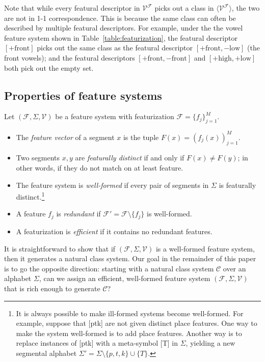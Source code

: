 \documentclass[11pt, oneside]{article}   	%
\begin{document}
Note that while every featural descriptor in $\mathcal V^\mathcal F$ picks out a class in $\langle \mathcal V^\mathcal F \rangle$, the two are not in 1-1 correspondence. This is because the same class can often be described by multiple featural descriptors. For example, under the the vowel feature system shown in Table~\ref{table:featurization}, the featural descriptor $[+\text{front}]$ picks out the same class as the featural descriptor $[+ \text{front}, - \text{low}]$ (the front vowels); and the featural descriptors $[+\text{front}, -\text{front}]$ and $[+\text{high}, +\text{low}]$ both pick out the empty set.

\subsection{Properties of feature systems}

\vspace{\baselineskip} \noindent Let $(\mathcal F, \Sigma, \mathcal V)$ be a feature system with featurization $\mathcal F = \{f_j\}_{j=1}^M$. \begin{itemize}
    \item The \textit{feature vector} of a segment $x$ is the tuple $F(x) = (f_j(x))_{j=1}^M$.
    \item Two segments $x, y$ are \textit{featurally distinct} if and only if $F(x) \neq F(y)$; in other words, if they do not match on at least feature.
    \item The feature system is \textit{well-formed} if every pair of segments in $\Sigma$ is featurally distinct.\footnote{It is always possible to make ill-formed systems become well-formed. For example, suppose that [ptk] are not given distinct place features. One way to make the system well-formed is to add place features. Another way is to replace instances of [ptk] with a meta-symbol [T] in $\Sigma$, yielding a new segmental alphabet $\Sigma ' = \Sigma \setminus \{p,t,k\} \cup \{T\}$.}
    \item A feature $f_j$ is \textit{redundant} if $\mathcal F' = \mathcal F \setminus \{ f_j \}$ is well-formed.
    \item A featurization is \textit{efficient} if it contains no redundant features.
    \end{itemize}

It is straightforward to show that if $(\mathcal F, \Sigma, \mathcal V)$ is a well-formed feature system, then it generates a natural class system.  Our goal in the remainder of this paper is to go the opposite direction: starting with a natural class system $\mathcal C$ over an alphabet $\Sigma$, can we assign an efficient, well-formed feature system $(\mathcal F, \Sigma, \mathcal V)$ that is rich enough to generate $\mathcal C$?
\end{document}
